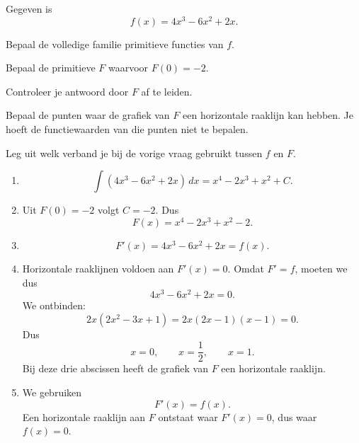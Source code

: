 \documentclass{ximera}
\begin{document}
\begin{oefening}{\oefU\ESS}

Gegeven is
\[
f(x)=4x^3-6x^2+2x.
\]

\begin{question}
Bepaal de volledige familie primitieve functies van $f$.
\end{question}

\begin{question}
Bepaal de primitieve $F$ waarvoor $F(0)=-2$.
\end{question}

\begin{question}
Controleer je antwoord door $F$ af te leiden.
\end{question}

\begin{question}
Bepaal de punten waar de grafiek van $F$ een horizontale raaklijn kan hebben. Je hoeft de functiewaarden van die punten niet te bepalen.
\end{question}

\begin{question}
Leg uit welk verband je bij de vorige vraag gebruikt tussen $f$ en $F$.
\end{question}

\begin{oplossing}

\begin{enumerate}
\item
\[
\int (4x^3-6x^2+2x)\,dx
=x^4-2x^3+x^2+C.
\]

\item Uit $F(0)=-2$ volgt $C=-2$. Dus
\[
\boxed{F(x)=x^4-2x^3+x^2-2}.
\]

\item
\[
F'(x)=4x^3-6x^2+2x=f(x).
\]

\item Horizontale raaklijnen voldoen aan $F'(x)=0$. Omdat $F'=f$, moeten we dus
\[
4x^3-6x^2+2x=0.
\]
We ontbinden:
\[
2x(2x^2-3x+1)=2x(2x-1)(x-1)=0.
\]
Dus
\[
x=0,\qquad x=\frac12,\qquad x=1.
\]
Bij deze drie abscissen heeft de grafiek van $F$ een horizontale raaklijn.

\item We gebruiken
\[
F'(x)=f(x).
\]
Een horizontale raaklijn aan $F$ ontstaat waar $F'(x)=0$, dus waar $f(x)=0$.
\end{enumerate}

\end{oplossing}

\end{oefening}
\end{document}
